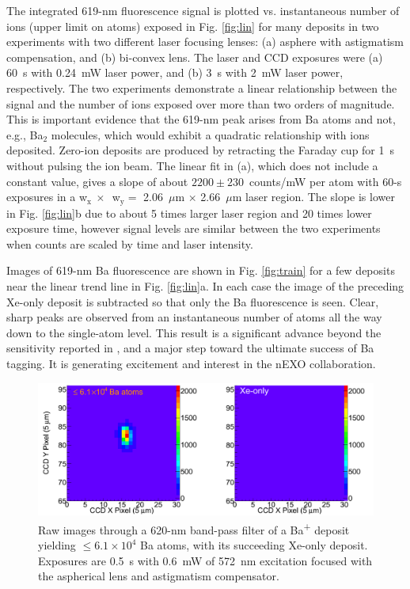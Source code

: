The integrated 619-nm fluorescence signal is plotted vs. instantaneous number of ions (upper limit on atoms) exposed in Fig. \ref{fig:lin} for many deposits in two experiments with two different laser focusing lenses:  (a) asphere with astigmatism compensation, and (b) bi-convex lens.  The laser and CCD exposures were (a) 60~s with 0.24~mW laser power, and (b) 3~s with 2~mW laser power, respectively.  The two experiments demonstrate a linear relationship between the signal and the number of ions exposed over more than two orders of magnitude.  This is important evidence that the 619-nm peak arises from Ba atoms and not, e.g., Ba$_{2}$ molecules, which would exhibit a quadratic relationship with ions deposited.  Zero-ion deposits are produced by retracting the Faraday cup for 1~s without pulsing the ion beam.  The linear fit in (a), which does not include a constant value, gives a slope of about $2200 \pm 230$~counts/mW per atom with 60-s exposures in a w$_{\text{x}}~\times$~w$_{\text{y}} =$ 2.06~$\mu$m $\times$ 2.66~$\mu$m laser region.  The slope is lower in Fig. \ref{fig:lin}b due to about 5 times larger laser region and 20 times lower exposure time, however signal levels are similar between the two experiments when counts are scaled by time and laser intensity.%

Images of 619-nm Ba fluorescence are shown in Fig. \ref{fig:train} for a few deposits near the linear trend line in Fig. \ref{fig:lin}a.  In each case the image of the preceding Xe-only deposit is subtracted so that only the Ba fluorescence is seen.  Clear, sharp peaks are observed from an instantaneous number of atoms all the way down to the single-atom level.  This result is a significant advance beyond the sensitivity reported in \cite{Mong2015}, and a major step toward the ultimate success of Ba tagging.  It is generating excitement and interest in the nEXO collaboration.


\begin{figure} %
        \centering
                \includegraphics[width=.95\textwidth]{figures/xebaxe_largest_instantaneous.png}
                \caption{Raw images through a 620-nm band-pass filter of a Ba\textsuperscript{+} deposit yielding $\leq 6.1 \times 10^{4}$ Ba atoms, with its succeeding Xe-only deposit.  Exposures are 0.5~s with 0.6~mW of 572~nm excitation focused with the aspherical lens and astigmatism compensator.}
\label{fig:xebaxeLarger}
\end{figure}

